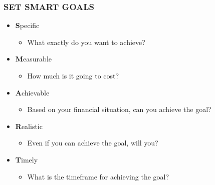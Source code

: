 \documentclass[12pt]{article}
\begin{document}
            \subsubsection{SET SMART GOALS}
                \begin{itemize}
                    \item \textbf{S}pecific
                        \begin{itemize}
                            \item What exactly do you want to achieve?
                        \end{itemize}
                    \item \textbf{M}easurable
                        \begin{itemize}
                            \item How much is it going to cost?
                        \end{itemize}
                    \item \textbf{A}chievable
                        \begin{itemize}
                            \item Based on your financial situation, can you achieve the goal?
                        \end{itemize}
                    \item \textbf{R}ealistic
                        \begin{itemize}
                            \item Even if you can achieve the goal, will you?
                        \end{itemize}
                    \item \textbf{T}imely
                        \begin{itemize}
                            \item What is the timeframe for achieving the goal?
                        \end{itemize}
                \end{itemize}
\end{document}
